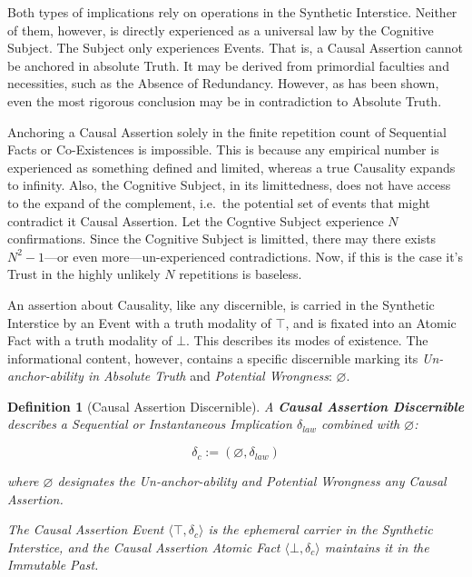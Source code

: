 \documentclass[11pt, a4paper]{article}
\theoremstyle{formalism}
\newtheorem{formalism}{Definition}
\begin{document}
Both types of implications rely on operations in the Synthetic Interstice.
Neither of them, however, is directly experienced as a universal law by the
Cognitive Subject. The Subject only experiences Events. That is, a
Causal Assertion cannot be anchored in absolute Truth. It
may be derived from primordial faculties and necessities, such as the Absence
of Redundancy. However, as has been shown, even the most rigorous conclusion may
be in contradiction to Absolute Truth. 

Anchoring a Causal Assertion solely in the finite repetition count of
Sequential Facts or Co-Existences is impossible. This is because any empirical
number is experienced as something defined and limited, whereas a true
Causality expands to infinity. Also, the Cognitive Subject, in its
limittedness, does not have access to the expand of the complement, i.e.\ the
potential set of events that might contradict it Causal Assertion. Let the
Cogntive Subject experience $N$ confirmations. Since the Cognitive Subject is
limitted, there may there exists $N^2-1$---or even more---un-experienced
contradictions. Now, if this is the case it's Trust in the highly unlikely $N$
repetitions is baseless.

An assertion about Causality, like any discernible, is carried in the Synthetic
Interstice by an Event with a truth modality of $\top$, and is fixated into an
Atomic Fact with a truth modality of $\bot$. This describes its modes of
existence. The informational content, however, contains a specific discernible
marking its \textit{Un-anchor-ability in Absolute Truth} and \textit{Potential
Wrongness}: $\varnothing$.

\begin{formalism}[Causal Assertion Discernible]

    A \textbf{Causal Assertion Discernible} describes a Sequential or
    Instantaneous Implication $\delta_{law}$ combined with $\varnothing$:

    \begin{equation}
        \delta_c := (\varnothing, \delta_{law})
    \end{equation}

    where $\varnothing$ designates the Un-anchor-ability and Potential Wrongness 
    any Causal Assertion.

    The Causal Assertion Event $\langle \top, \delta_c \rangle$ is the ephemeral
    carrier in the Synthetic Interstice, and the Causal Assertion Atomic Fact
    $\langle \bot, \delta_c\rangle$ maintains it in the Immutable Past. 

\end{formalism}
\end{document}
